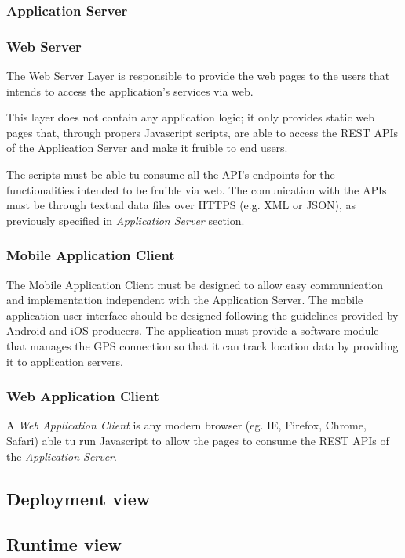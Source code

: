 \documentclass{article}
\begin{document}
	\subsubsection{Application Server}


	\subsubsection{Web Server}
	The Web Server Layer is responsible to provide the web pages to the users that intends to access the application's services via web.
	
	\bigskip
	This layer does not contain any application logic; it only provides static web pages that, through propers Javascript scripts, are able to access the REST APIs of the Application Server and make it fruible to end users.

	\bigskip
	The scripts must be able tu consume all the API's endpoints for the functionalities intended to be fruible via web.
	The comunication with the APIs must be through textual data files over HTTPS (e.g. XML or JSON), as previously specified in \textit{Application Server} section.


	\subsubsection{Mobile Application Client}
	The Mobile Application Client must be designed to allow easy communication and implementation independent with the Application Server.
	The mobile application user interface should be designed following the guidelines provided by Android and iOS producers.
	The application must provide a software module that manages the GPS connection so that it can track location data by providing it to application servers.


	\subsubsection{Web Application Client}
	A \textit{Web Application Client} is any modern browser (eg. IE, Firefox, Chrome, Safari) able tu run Javascript to allow the pages to consume the REST APIs of the \textit{Application Server}.


	\subsection{Deployment view}


	\subsection{Runtime view}
\end{document}

